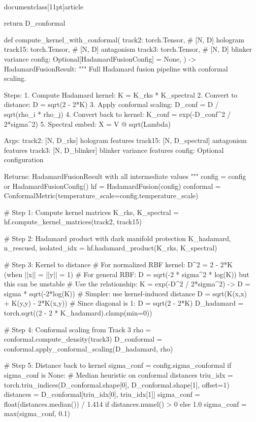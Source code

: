 \\documentclass[11pt]{article}
\begin{document}
\begin{CodeBlock}
        return D_conformal


def compute_kernel_with_conformal(
    track2: torch.Tensor,       # [N, D] hologram
    track15: torch.Tensor,      # [N, D] antagonism
    track3: torch.Tensor,       # [N, D] blinker variance
    config: Optional[HadamardFusionConfig] = None,
) -> HadamardFusionResult:
    """
    Full Hadamard fusion pipeline with conformal scaling.

    Steps:
    1. Compute Hadamard kernel: K = K_rks * K_spectral
    2. Convert to distance: D = sqrt(2 - 2*K)
    3. Apply conformal scaling: D_conf = D / sqrt(rho_i * rho_j)
    4. Convert back to kernel: K_conf = exp(-D_conf^2 / 2*sigma^2)
    5. Spectral embed: X = V @ sqrt(Lambda)

    Args:
        track2: [N, D_rks] hologram features
        track15: [N, D_spectral] antagonism features
        track3: [N, D_blinker] blinker variance features
        config: Optional configuration

    Returns:
        HadamardFusionResult with all intermediate values
    """
    config = config or HadamardFusionConfig()
    hf = HadamardFusion(config)
    conformal = ConformalMetric(temperature_scale=config.temperature_scale)

    # Step 1: Compute kernel matrices
    K_rks, K_spectral = hf.compute_kernel_matrices(track2, track15)

    # Step 2: Hadamard product with dark manifold protection
    K_hadamard, n_rescued, isolated_idx = hf.hadamard_product(K_rks, K_spectral)

    # Step 3: Kernel to distance
    # For normalized RBF kernel: D^2 = 2 - 2*K (when ||x|| = ||y|| = 1)
    # For general RBF: D = sqrt(-2 * sigma^2 * log(K)) but this can be unstable
    # Use the relationship: K = exp(-D^2 / 2*sigma^2) -> D = sigma * sqrt(-2*log(K))
    # Simpler: use kernel-induced distance D = sqrt(K(x,x) + K(y,y) - 2*K(x,y))
    # Since diagonal is 1: D = sqrt(2 - 2*K)
    D_hadamard = torch.sqrt((2 - 2 * K_hadamard).clamp(min=0))

    # Step 4: Conformal scaling from Track 3
    rho = conformal.compute_density(track3)
    D_conformal = conformal.apply_conformal_scaling(D_hadamard, rho)

    # Step 5: Distance back to kernel
    sigma_conf = config.sigma_conformal
    if sigma_conf is None:
        # Median heuristic on conformal distances
        triu_idx = torch.triu_indices(D_conformal.shape[0], D_conformal.shape[1], offset=1)
        distances = D_conformal[triu_idx[0], triu_idx[1]]
        sigma_conf = float(distances.median()) / 1.414 if distances.numel() > 0 else 1.0
        sigma_conf = max(sigma_conf, 0.1)


\end{CodeBlock}
\end{document}
